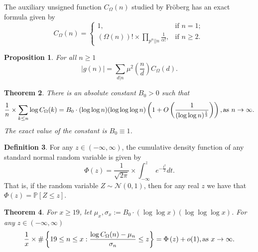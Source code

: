 \documentclass[11pt,reqno,a4letter]{article}
\numberwithin{equation}{section}
\numberwithin{figure}{section}
\numberwithin{table}{section}
\theoremstyle{plain}
\newtheorem{theorem}{Theorem}
\newtheorem{prop}[theorem]{Proposition}
\numberwithin{theorem}{section}
\theoremstyle{definition}
\newtheorem{definition}[theorem]{Definition}
\theoremstyle{remark}
\newcommand{\mathtext}[1]{\text{\rm #1}}
\begin{document}
The auxiliary unsigned function $C_{\Omega}(n)$ studied by Fr\"oberg 
\cite{FROBERG-1968} has an exact formula given by 
\begin{equation}
\label{eqn_proof_tag_hInvn_ExactNestedSumFormula_CombInterpetIdent_v3}
C_{\Omega}(n) = \begin{cases}
     1, & \text{if $n = 1$; } \\ 
     (\Omega(n))! \times \prod\limits_{p^{\alpha}||n} \frac{1}{\alpha!}, & \text{if $n \geq 2$. }
     \end{cases}
\end{equation} 

\begin{prop} 
\label{lemma_AbsValueOf_gInvn_FornSquareFree_v1} 
For all $n \geq 1$ 
\begin{equation} 
\label{eqn_AbsValueOf_gInvn_FornSquareFree_v1} 
|g(n)| = \sum_{d|n} \mu^2\left(\frac{n}{d}\right) C_{\Omega}(d). 
\end{equation} 
\end{prop} 

\begin{theorem} 
\label{lemma_HatCAstxSum_ExactFormulaWithError_v1} 
There is an absolute constant $B_0 > 0$ such that 
\[
\frac{1}{n} \times \sum_{k \leq n} \log C_{\Omega}(k) = 
     B_0 \cdot (\log\log n)(\log\log\log n) \left(1 + 
     O\left(\frac{1}{(\log\log n)^{\frac{1}{3}}}\right)\right), 
     \mathtext{ as } n \rightarrow \infty. 
\] 
The exact value of the constant is $B_0 \equiv 1$. 
\end{theorem} 

\begin{definition}
For any $z \in (-\infty, \infty)$, the cumulative density function of any 
standard normal random variable is given by 
\[
\Phi(z) = \frac{1}{\sqrt{2\pi}} \times \int_{-\infty}^{z} e^{-\frac{t^2}{2}} dt. 
\]
That is, if the random variable $Z \sim \mathcal{N}(0, 1)$, 
then for any real $z$ we have that 
$\Phi(z) = \mathbb{P}\left[Z \leq z\right]$. 
\end{definition}

\begin{theorem}
\label{conj_DetFormOfEKTypeThmForCOmegan_v1} 
For $x \geq 19$, let $\mu_x, \sigma_x := B_0 \cdot (\log\log x)(\log\log\log x)$.
For any $z \in (-\infty, \infty)$ 
\begin{equation} 
\notag
\frac{1}{x} \times 
	\#\left\{19 \leq n \leq x: \frac{\log C_{\Omega}(n) - \mu_n}{\sigma_n} \leq z\right\} = 
        \Phi\left(z\right) + o(1), 
	\mathtext{ as } x \rightarrow \infty. 
\end{equation}
\end{theorem} 
\end{document}
